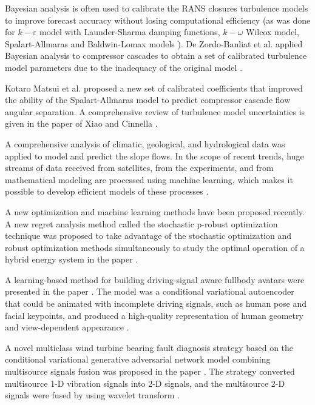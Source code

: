 \documentclass[mathematics,article,submit,pdftex,moreauthors]{Definitions/mdpi}
\begin{document}
Bayesian analysis is often used to calibrate the RANS closures turbulence models to improve forecast accuracy without losing computational efficiency (as was done for $k-\varepsilon$ model with Launder-Sharma damping functions, $k-\omega$ Wilcox model, Spalart-Allmaras and Baldwin-Lomax models \cite{Edeling2014a,Edeling2014b}). De Zordo-Banliat et al. applied Bayesian analysis to compressor cascades to obtain a set of calibrated turbulence model parameters due to the inadequacy of the original model \cite{deZordoBanliat2020}.

Kotaro Matsui et al. \cite{Matsui2021} proposed a new set of calibrated coefficients that improved the ability of the Spalart-Allmaras model to predict compressor cascade flow angular separation. A comprehensive review of turbulence model uncertainties is given in the paper of Xiao and Cinnella \cite{Xiao2019}.

A comprehensive analysis of climatic, geological, and hydrological data was applied to model and predict the slope flows. In the scope of recent trends, huge streams of data received from satellites, from the experiments, and from mathematical modeling are processed using machine learning, which makes it possible to develop efficient models of these processes \cite{GeoML, Ma2020}.


A new optimization and machine learning methods have been proposed recently. A new regret analysis method called the stochastic p-robust optimization technique was proposed to take advantage of the stochastic optimization and robust optimization methods simultaneously to study the optimal operation of a hybrid energy system in the paper \cite{YuWuWang2022}.

A learning-based method for building driving-signal aware fullbody avatars were presented in the paper . The model was a conditional variational autoencoder that could be animated with incomplete driving signals, such as human pose and facial keypoints, and produced a high-quality representation of human geometry and view-dependent appearance \cite{BagautdinovWuSimon2021}. 

A novel multiclass wind turbine bearing fault diagnosis strategy based on the conditional variational generative adversarial network model combining multisource signals fusion was proposed in the paper . The strategy converted multisource 1-D vibration signals into 2-D signals, and the multisource 2-D signals were fused by using wavelet transform \cite{ZhangZhangCai2022}.
\end{document}
